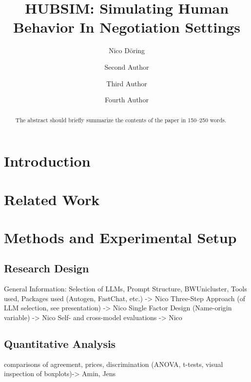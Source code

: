 \documentclass[runningheads]{llncs}
\begin{document}
%
\title{HUBSIM: Simulating Human Behavior In Negotiation Settings}
%
%
\author{Nico Döring \and
Second Author \and
Third Author \and Fourth Author}
%
%
%
\maketitle              %
%
\begin{abstract}
The abstract should briefly summarize the contents of the paper in
150--250 words.

\end{abstract}
%
%
%
\section{Introduction}
\section{Related Work}
\section{Methods and Experimental Setup}
\subsection{Research Design}
General Information: Selection of LLMs, Prompt Structure, BWUnicluster, Tools used, Packages used (Autogen, FastChat, etc.) -> Nico
Three-Step Approach (of LLM selection, see presentation) -> Nico
Single Factor Design (Name-origin variable) -> Nico
Self- and cross-model evaluations -> Nico

\subsection{Quantitative Analysis}
comparisons of agreement, prices, discrimination (ANOVA, t-tests, visual inspection of boxplots)-> Amin, Jens
\end{document}
